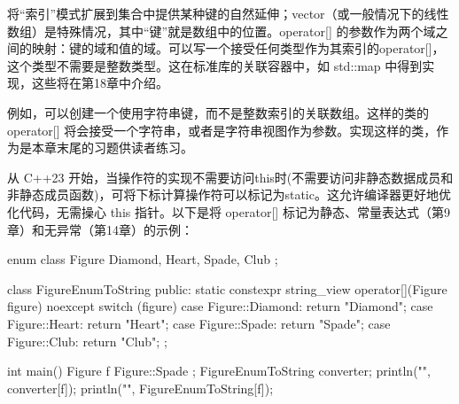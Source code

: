 
将“索引”模式扩展到集合中提供某种键的自然延伸；vector（或一般情况下的线性数组）是特殊情况，其中“键”就是数组中的位置。operator[] 的参数作为两个域之间的映射：键的域和值的域。可以写一个接受任何类型作为其索引的operator[]，这个类型不需要是整数类型。这在标准库的关联容器中，如 std::map 中得到实现，这些将在第18章中介绍。

例如，可以创建一个使用字符串键，而不是整数索引的关联数组。这样的类的 operator[] 将会接受一个字符串，或者是字符串视图作为参数。实现这样的类，作为是本章末尾的习题供读者练习。

\hspace*{\fill}



从 C++23 开始，当操作符的实现不需要访问this时(不需要访问非静态数据成员和非静态成员函数)，可将下标计算操作符可以标记为static。这允许编译器更好地优化代码，无需操心 this 指针。以下是将 operator[] 标记为静态、常量表达式（第9章）和无异常（第14章）的示例：

\begin{cpp}
enum class Figure { Diamond, Heart, Spade, Club };

class FigureEnumToString
{
    public:
        static constexpr string_view operator[](Figure figure) noexcept
        {
            switch (figure) {
                case Figure::Diamond: return "Diamond";
                case Figure::Heart: return "Heart";
                case Figure::Spade: return "Spade";
                case Figure::Club: return "Club";
            }
        }
};

int main()
{
    Figure f { Figure::Spade };
    FigureEnumToString converter;
    println("{}", converter[f]);
    println("{}", FigureEnumToString{}[f]);
}
\end{cpp}













